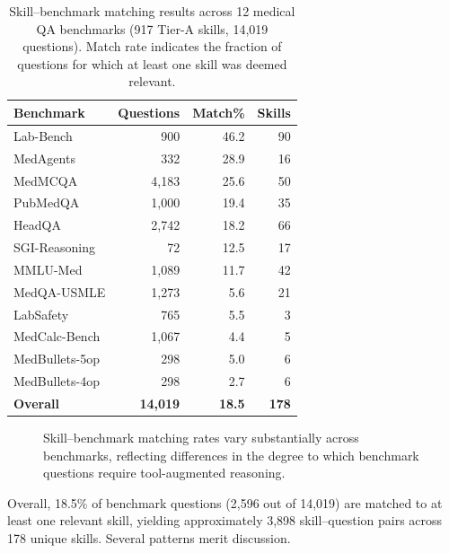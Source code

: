 \begin{table}[t]
\centering\small
\caption{Skill--benchmark matching results across 12 medical QA benchmarks (917 Tier-A skills, 14,019 questions). Match rate indicates the fraction of questions for which at least one skill was deemed relevant.}
\begin{tabular}{lrrr}
\toprule
\textbf{Benchmark} & \textbf{Questions} & \textbf{Match\%} & \textbf{Skills} \\
\midrule
Lab-Bench \citep{labbench2024}       & 900   & 46.2 & 90 \\
MedAgents                             & 332   & 28.9 & 16 \\
MedMCQA \citep{medmcqa2022}          & 4,183 & 25.6 & 50 \\
PubMedQA \citep{pubmedqa2019}        & 1,000 & 19.4 & 35 \\
HeadQA \citep{headqa2019}            & 2,742 & 18.2 & 66 \\
SGI-Reasoning                        &    72 & 12.5 & 17 \\
MMLU-Med \citep{mmlu2021}            & 1,089 & 11.7 & 42 \\
MedQA-USMLE \citep{medqa2021}       & 1,273 &  5.6 & 21 \\
LabSafety                            &   765 &  5.5 &  3 \\
MedCalc-Bench                        & 1,067 &  4.4 &  5 \\
MedBullets-5op                       &   298 &  5.0 &  6 \\
MedBullets-4op                       &   298 &  2.7 &  6 \\
\midrule
\textbf{Overall}                     & \textbf{14,019} & \textbf{18.5} & \textbf{178} \\
\bottomrule
\end{tabular}
\label{tab:benchmark_match}
\end{table}

\begin{figure}[t]
\caption{Skill--benchmark matching rates vary substantially across benchmarks, reflecting differences in the degree to which benchmark questions require tool-augmented reasoning.}
\label{fig:benchmark_match}
\end{figure}

Overall, 18.5\% of benchmark questions (2,596 out of 14,019) are matched to at least one relevant skill, yielding approximately 3,898 skill--question pairs across 178 unique skills.
Several patterns merit discussion.

